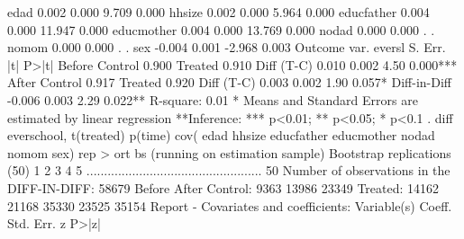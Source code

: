 edad                 {\VBAR} 0.002      {\VBAR} 0.000     {\VBAR} 9.709   {\VBAR} 0.000
hhsize               {\VBAR} 0.002      {\VBAR} 0.000     {\VBAR} 5.964   {\VBAR} 0.000
educfather           {\VBAR} 0.004      {\VBAR} 0.000     {\VBAR} 11.947  {\VBAR} 0.000
educmother           {\VBAR} 0.004      {\VBAR} 0.000     {\VBAR} 13.769  {\VBAR} 0.000
nodad                {\VBAR} 0.000      {\VBAR} 0.000     {\VBAR}     .   {\VBAR}     .
nomom                {\VBAR} 0.000      {\VBAR} 0.000     {\VBAR}     .   {\VBAR}     .
sex                  {\VBAR} -0.004     {\VBAR} 0.001     {\VBAR} -2.968  {\VBAR} 0.003
 Outcome var.   {\VBAR} evers{\tytilde}l {\VBAR} S. Err. {\VBAR}   |t|   {\VBAR}  P>|t|
Before          {\VBAR}         {\VBAR}         {\VBAR}         {\VBAR} 
   Control      {\VBAR} 0.900   {\VBAR}         {\VBAR}         {\VBAR} 
   Treated      {\VBAR} 0.910   {\VBAR}         {\VBAR}         {\VBAR} 
   Diff (T-C)   {\VBAR} 0.010   {\VBAR} 0.002   {\VBAR} 4.50    {\VBAR} 0.000***
After           {\VBAR}         {\VBAR}         {\VBAR}         {\VBAR} 
   Control      {\VBAR} 0.917   {\VBAR}         {\VBAR}         {\VBAR} 
   Treated      {\VBAR} 0.920   {\VBAR}         {\VBAR}         {\VBAR} 
   Diff (T-C)   {\VBAR} 0.003   {\VBAR} 0.002   {\VBAR} 1.90    {\VBAR} 0.057*
                {\VBAR}         {\VBAR}         {\VBAR}         {\VBAR} 
Diff-in-Diff    {\VBAR} -0.006  {\VBAR} 0.003   {\VBAR} 2.29    {\VBAR} 0.022**
R-square:    0.01
* Means and Standard Errors are estimated by linear regression
**Inference: *** p<0.01; ** p<0.05; * p<0.1
{\smallskip}
. diff everschool, t(treated) p(time) cov( edad hhsize educfather educmother nodad nomom  sex) rep
> ort bs
{}
(running {} on estimation sample)
{\smallskip}
Bootstrap replications (50)
 1  2  3  4  5 
..................................................    50
{\smallskip}
{}
Number of observations in the DIFF-IN-DIFF: 58679
            Before         After    
   Control: 9363           13986       23349
   Treated: 14162          21168       35330
            23525          35154
Report - Covariates and coefficients:
 Variable(s)         {\VBAR}   Coeff.   {\VBAR} Std. Err. {\VBAR}    z    {\VBAR}  P>|z|

